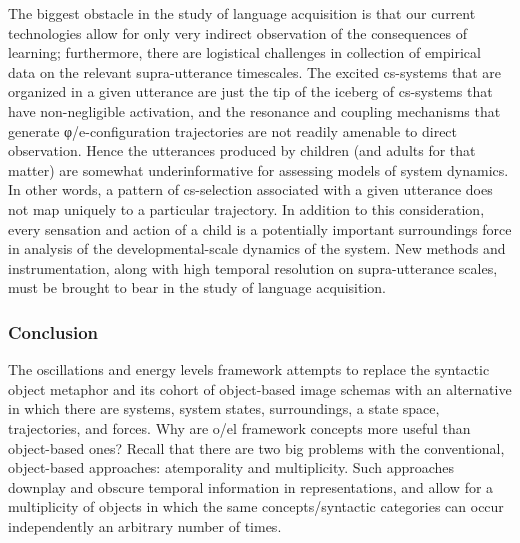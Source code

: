 The biggest obstacle in the study of language acquisition is that our current technologies allow for only very indirect observation of the consequences of learning; furthermore, there are logistical challenges in collection of empirical data on the relevant supra-utterance timescales. The excited cs-systems that are organized in a given utterance are just the tip of the iceberg of cs-systems that have non-negligible activation, and the resonance and coupling mechanisms that generate φ/e-configuration trajectories are not readily amenable to direct observation. Hence the utterances produced by children (and adults for that matter) are somewhat underinformative for assessing models of system dynamics. In other words, a pattern of cs-selection associated with a given utterance does not map uniquely to a particular trajectory. In addition to this consideration, every sensation and action of a child is a potentially important surroundings force in analysis of the developmental-scale dynamics of the system. New methods and instrumentation, along with high temporal resolution on supra-utterance scales, must be brought to bear in the study of language acquisition.

\subsubsection{Conclusion}

The oscillations and energy levels framework attempts to replace the syntactic object metaphor and its cohort of object-based image schemas with an alternative in which there are systems, system states, surroundings, a state space, trajectories, and forces. Why are o/el framework concepts more useful than object-based ones? Recall that there are two big problems with the conventional, object-based approaches: atemporality and multiplicity. Such approaches downplay and obscure temporal information in representations, and allow for a multiplicity of objects in which the same concepts/syntactic categories can occur independently an arbitrary number of times. 

